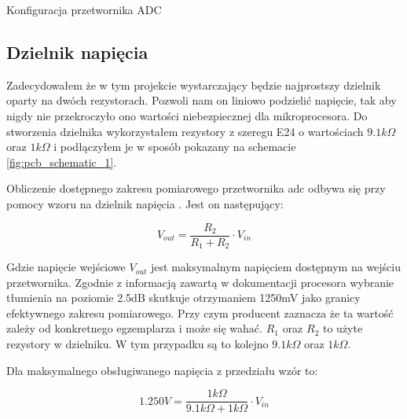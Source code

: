         \begin{kod}
          \inputminted[firstline=8,lastline=17]{cpp}{esp/listings/adc.cpp}
          \caption{Konfiguracja przetwornika ADC}
          \label{code:adc1}
          \vspace{2em}
        \end{kod}
        

    

        
    \subsection{Dzielnik napięcia}
        Zadecydowałem że w tym projekcie wystarczający będzie najprostszy dzielnik oparty na dwóch rezystorach. Pozwoli nam on liniowo podzielić napięcie, tak aby nigdy nie przekroczyło ono wartości niebezpiecznej dla mikroprocesora. Do stworzenia dzielnika wykorzystałem rezystory z szeregu E24 \cite{szereg} o wartościach $9.1k \Omega $ oraz $1k \Omega $ i podłączyłem je w sposób pokazany na schemacie \ref{fig:pcb_schematic_1}.
        
        Obliczenie dostępnego zakresu pomiarowego przetwornika adc odbywa się przy pomocy wzoru na dzielnik napięcia \cite{dzielnik}. Jest on następujący:
        
        \vspace{1em}
        \begin{displaymath}
          V_{out} = \frac{ R_2 }{ R_1 + R_2 } \cdot V_{in}
        \end{displaymath}
        \vspace{1em}
        
        Gdzie napięcie wejściowe $V_{out}$ jest maksymalnym napięciem dostępnym na wejściu przetwornika. Zgodnie z informacją zawartą w dokumentacji procesora \cite{esp32} wybranie tłumienia na poziomie 2.5dB skutkuje otrzymaniem 1250mV jako granicy efektywnego zakresu pomiarowego. Przy czym producent zaznacza że ta wartość zależy od konkretnego egzemplarza i może się wahać. $R_1$ oraz $R_2$ to użyte rezystory w dzielniku. W tym przypadku są to kolejno $9.1k \Omega $ oraz $1k \Omega $.
        
        Dla maksymalnego obsługiwanego napięcia z przedziału wzór to:
        
        \vspace{1em}
        \begin{displaymath}
          1.250V = \frac{ 1k \Omega  }{ 9.1k \Omega  + 1k \Omega  } \cdot V_{in}
        \end{displaymath}
        \vspace{1em}
        
